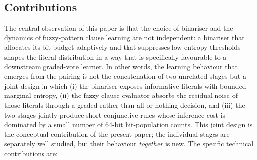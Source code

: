 \documentclass[journal,10pt]{IEEEtran}
\begin{document}
\subsection{Contributions}
The central observation of this paper is that the choice of
binariser and the dynamics of fuzzy-pattern clause learning are not
independent: a binariser that allocates its bit budget adaptively
and that suppresses low-entropy thresholds shapes the literal
distribution in a way that is specifically favourable to a
downstream graded-vote learner. In other words, the learning
behaviour that emerges from the pairing is not the concatenation of
two unrelated stages but a joint design in which (i) the binariser
exposes informative literals with bounded marginal entropy, (ii)
the fuzzy clause evaluator absorbs the residual noise of those
literals through a graded rather than all-or-nothing decision, and
(iii) the two stages jointly produce short conjunctive rules whose
inference cost is dominated by a small number of 64-bit
bit-population counts. This joint design is the conceptual
contribution of the present paper; the individual stages are
separately well studied, but their behaviour \emph{together} is
new. The specific technical contributions are:
\end{document}
